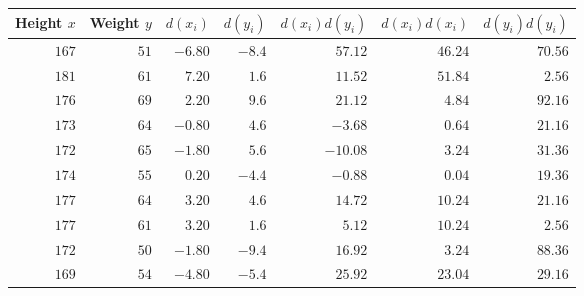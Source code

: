 \begin{tabular}{rrrrrrr}                                                               \toprule
Height $x$ & Weight $y$ & $d(x_i)$ & $d(y_i)$ & $d(x_i)d(y_i)$ & $d(x_i)d(x_i)$ & $d(y_i)d(y_i)$ \\\midrule
$167$      & $51$       & $-6.80$  & $-8.4$   & $57.12$        & $46.24$        & $70.56$        \\
$181$      & $61$       & $7.20$   & $1.6$    & $11.52$        & $51.84$        & $2.56$         \\
$176$      & $69$       & $2.20$   & $9.6$    & $21.12$        & $4.84$         & $92.16$        \\
$173$      & $64$       & $-0.80$  & $4.6$    & $-3.68$        & $0.64$         & $21.16$        \\
$172$      & $65$       & $-1.80$  & $5.6$    & $-10.08$       & $3.24$         & $31.36$        \\
$174$      & $55$       & $0.20$   & $-4.4$   & $-0.88$        & $0.04$         & $19.36$        \\
$177$      & $64$       & $3.20$   & $4.6$    & $14.72$        & $10.24$        & $21.16$        \\
$177$      & $61$       & $3.20$   & $1.6$    & $5.12$         & $10.24$        & $2.56$         \\
$172$      & $50$       & $-1.80$  & $-9.4$   & $16.92$        & $3.24$         & $88.36$        \\
$169$      & $54$       & $-4.80$  & $-5.4$   & $25.92$        & $23.04$        & $29.16$        \\\bottomrule
\end{tabular}
